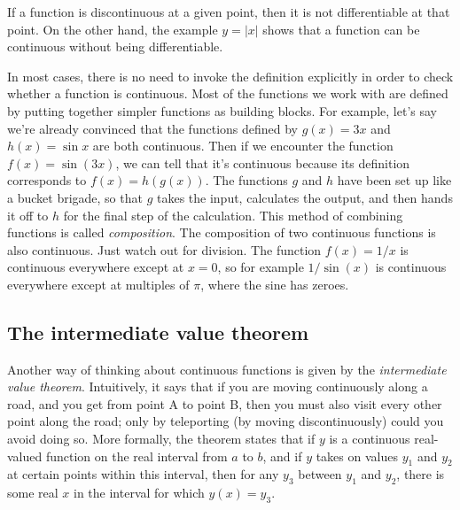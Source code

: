 
If a function is discontinuous at a given point, then it is not differentiable at that point.
On the other hand, the example $y=|x|$ shows that a function can be continuous without
being differentiable.

In most cases, there is no need to invoke the definition explicitly in order to check whether
a function is continuous. Most of the functions we work with are defined by putting together
simpler functions as building blocks. For example, let's say we're already convinced that the
functions defined by $g(x)=3x$ and $h(x)=\sin x$ are both continuous. Then if we encounter the
function $f(x)=\sin(3x)$, we can tell that it's continuous because its definition corresponds
to $f(x)=h(g(x))$. The functions $g$ and $h$ have been set up like a bucket brigade, so that
$g$ takes the input, calculates the output, and then hands it off to $h$ for the final step
of the calculation. This method of combining functions is called \emph{composition}.
The composition of two continuous functions is also continuous. Just watch out for division.
The function $f(x)=1/x$ is continuous everywhere except at $x=0$, so for example $1/\sin(x)$
is continuous everywhere except at multiples of $\pi$, where the sine has zeroes.

\subsection{The intermediate value theorem}

Another way of thinking about continuous functions is given by the
\emph{intermediate value theorem}.
Intuitively, it says that if you are moving continuously along a road, 
and you get from point A to point B, then you must also visit every other point
along the road; only by teleporting (by moving discontinuously) could you
avoid doing so. More formally, the theorem states
that if $y$ is a continuous real-valued function on the real interval from $a$ to $b$,
and if $y$ takes on values $y_1$ and $y_2$ at certain points within this interval, then for any $y_3$ between $y_1$ and
$y_2$, there is some real $x$ in the interval for which $y(x)=y_3$.


